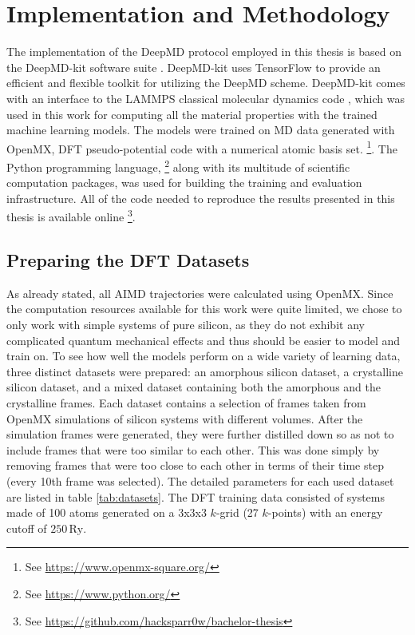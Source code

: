 \chapter{Implementation and Methodology}

The implementation of the DeepMD protocol employed in this thesis is based on
the DeepMD-kit software suite \cite{Wang_DeePMD-kit_A_deep_2018}. DeepMD-kit
uses TensorFlow \cite{tensorflow2015-whitepaper} to provide an efficient and
flexible toolkit for utilizing the DeepMD scheme. DeepMD-kit comes with an
interface to the LAMMPS classical molecular dynamics code \cite{LAMMPS},
which was used in this work for computing all the material properties with the
trained machine learning models. The models were trained on MD data generated
with OpenMX, DFT pseudo-potential code with a numerical atomic basis set.
\footnote{
    See \url{https://www.openmx-square.org/}
}. The Python programming language,
\footnote{
    See \url{https://www.python.org/}
} along with its multitude of scientific computation packages, was used for
building the training and evaluation infrastructure. All of the code needed to
reproduce the results presented in this thesis is available online
\footnote{
    See \url{https://github.com/hacksparr0w/bachelor-thesis}
}.

\section{Preparing the DFT Datasets}

As already stated, all AIMD trajectories were calculated using OpenMX. Since
the computation resources available for this work were quite limited, we
chose to only work with simple systems of pure silicon, as they do not
exhibit any complicated quantum mechanical effects and thus should be easier to model and
train on. To see how well the models perform on a wide variety of learning
data, three distinct datasets were prepared: an amorphous silicon dataset, a
crystalline silicon dataset, and a mixed dataset containing both the amorphous
and the crystalline frames. Each dataset contains a selection of frames taken
from OpenMX simulations of silicon systems with different volumes. After the
simulation frames were generated, they were further distilled down so as not
to include frames that were too similar to each other. This was done simply by
removing frames that were too close to each other in terms of their time step
(every 10th frame was selected). The detailed parameters for each used dataset
are listed in table \ref{tab:datasets}. The DFT training data consisted of
systems made of 100 atoms generated on a 3x3x3 $k$-grid (27 $k$-points) with
an energy cutoff of $250 \, \mathrm{Ry}$.

